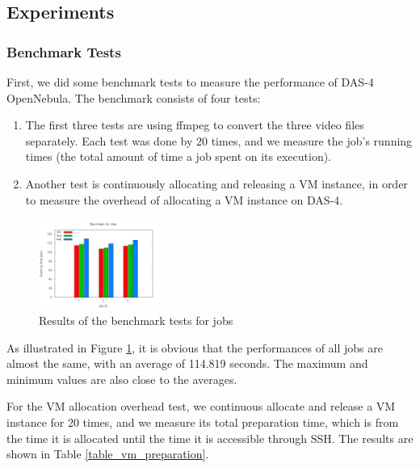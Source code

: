 \subsection{Experiments}

\subsubsection{Benchmark Tests}
First, we did some benchmark tests to measure the performance of DAS-4
OpenNebula. The benchmark consists of four tests:

\begin{enumerate}
\item The first three tests are using ffmpeg to convert the three
  video files separately. Each test was done by 20 times, and we
  measure the job's running times (the total amount of time a job
  spent on its execution).
\item Another test is continuously allocating and releasing a VM
  instance, in order to measure the overhead of allocating a VM
  instance on DAS-4.
\end{enumerate}

\begin{figure}[!t]
\centering
\includegraphics[width=0.35\textwidth]{pictures/bench-jobs.png}
\caption{Results of the benchmark tests for jobs}
\label{figure_jobbenchmark}
\end{figure}

As illustrated in Figure \ref{figure_jobbenchmark}, it is obvious that
the performances of all jobs are almost the same, with an average of
114.819 seconds. The maximum and minimum values are also close to the
averages.

For the VM allocation overhead test, we continuous allocate and
release a VM instance for 20 times, and we measure its total
preparation time, which is from the time it is allocated until the
time it is accessible through SSH. The results are shown in Table
\ref{table_vm_preparation}.

